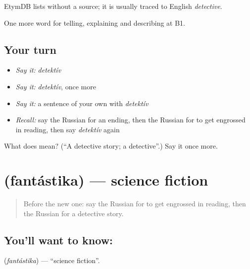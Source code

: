 \begin{cousinweb}
EtymDB lists \emph{} without a source; it is usually traced to English \emph{detective}.
\end{cousinweb}

\begin{grammarlens}[title={What you've built}]
One more word for telling, explaining and describing at B1.
\end{grammarlens}

\subsection*{Your turn}
\begin{itemize}
\raggedright
  \item \emph{Say it:} \emph{detektív}
  \item \emph{Say it:} \emph{detektív}, once more
  \item \emph{Say it:} a sentence of your own with \emph{detektív}
  \item \emph{Recall:} say the Russian for an ending, then the Russian for to get engrossed in reading, then say \emph{detektív} again
\end{itemize}

\begin{tcolorbox}[breakable,colback=teal!4,colframe=teal!35!black,title={Before you move on}]
What does  mean? (\textquotedblleft{}A detective story; a detective\textquotedblright{}.) Say it once more.
\end{tcolorbox}
\section[\texorpdfstring{\ru{фантастика} (fantástika)}{фантастика (fantástika)}]{ (fantástika) — science fiction}

\label{lesson:RU-C524-fantastika}



\begin{quote}
Before the new one: say the Russian for to get engrossed in reading, then the Russian for a detective story.
\end{quote}

\subsection*{You'll want to know: }
\textbf{} (\emph{fantástika}) — \textquotedblleft{}science fiction\textquotedblright{}.

